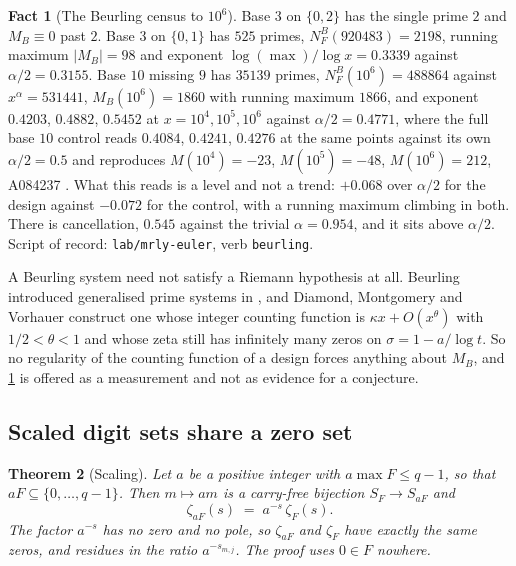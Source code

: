 \documentclass[11pt]{amsart}
\newtheorem{theorem}{Theorem}[section]
\theoremstyle{definition}
\newtheorem{fact}[theorem]{Fact}
\theoremstyle{remark}
\begin{document}
\begin{fact}[The Beurling census to $10^{6}$]
\label{fact:beurling}
Base $3$ on $\{0,2\}$ has the single prime $2$ and $M_{B} \equiv 0$ past $2$. Base $3$ on $\{0,1\}$ has $525$ primes, $N_{F}^{B}(920483) = 2198$, running maximum $|M_{B}| = 98$ and exponent $\log(\max)/\log x = 0.3339$ against $\alpha/2 = 0.3155$. Base $10$ missing $9$ has $35139$ primes, $N_{F}^{B}(10^{6}) = 488864$ against $x^{\alpha} = 531441$, $M_{B}(10^{6}) = 1860$ with running maximum $1866$, and exponent $0.4203$, $0.4882$, $0.5452$ at $x = 10^{4}, 10^{5}, 10^{6}$ against $\alpha/2 = 0.4771$, where the full base $10$ control reads $0.4084$, $0.4241$, $0.4276$ at the same points against its own $\alpha/2 = 0.5$ and reproduces $M(10^{4}) = -23$, $M(10^{5}) = -48$, $M(10^{6}) = 212$, A084237 \cite{a084237}. What this reads is a level and not a trend: $+0.068$ over $\alpha/2$ for the design against $-0.072$ for the control, with a running maximum climbing in both. There is cancellation, $0.545$ against the trivial $\alpha = 0.954$, and it sits above $\alpha/2$. Script of record: \texttt{lab/mrly-euler}, verb \texttt{beurling}.
\end{fact}

A Beurling system need not satisfy a Riemann hypothesis at all. Beurling introduced generalised prime systems in \cite{beur}, and Diamond, Montgomery and Vorhauer \cite{dmv} construct one whose integer counting function is $\kappa x + O(x^{\theta})$ with $1/2 < \theta < 1$ and whose zeta still has infinitely many zeros on $\sigma = 1 - a/\log t$. So no regularity of the counting function of a design forces anything about $M_{B}$, and \cref{fact:beurling} is offered as a measurement and not as evidence for a conjecture.

\subsection{Scaled digit sets share a zero set}
\label{sub:scaling}

\begin{theorem}[Scaling]
\label{thm:scaling}
Let $a$ be a positive integer with $a \max F \le q - 1$, so that $aF \subseteq \{0,\dots,q-1\}$. Then $m \mapsto am$ is a carry-free bijection $S_{F} \to S_{aF}$ and
\[
  \zeta_{aF}(s) \;=\; a^{-s}\,\zeta_{F}(s).
\]
The factor $a^{-s}$ has no zero and no pole, so $\zeta_{aF}$ and $\zeta_{F}$ have exactly the same zeros, and residues in the ratio $a^{-s_{m,j}}$. The proof uses $0 \in F$ nowhere.
\end{theorem}
\end{document}

